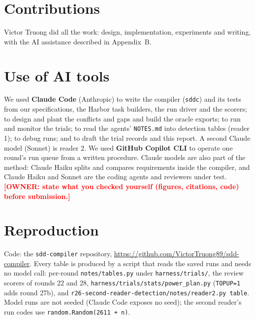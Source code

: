 \documentclass{article}
\newcommand{\owner}[1]{\textcolor{red}{\textbf{[OWNER: #1]}}}
\newcommand{\code}[1]{\texttt{#1}}
\begin{document}



\appendix

\section{Contributions}
Victor Truong did all the work: design, implementation, experiments and writing, with the AI assistance
described in Appendix~B.

\section{Use of AI tools}
We used \textbf{Claude Code} (Anthropic) to write the compiler (\code{sddc}) and its tests from our
specifications, the Harbor task builders, the run driver and the scorers; to design and plant the
conflicts and gaps and build the oracle exports; to run and monitor the trials; to read the agents'
\code{NOTES.md} into detection tables (reader 1); to debug runs; and to draft the trial records and this
report. A second Claude model (Sonnet) is reader 2. We used \textbf{GitHub Copilot CLI} to operate one round's
run queue from a written procedure. Claude models are also part of the method: Claude Haiku splits and
compares requirements inside the compiler, and Claude Haiku and Sonnet are the coding agents and reviewers
under test. \owner{state what you checked yourself (figures, citations, code) before submission.}

\section{Reproduction}
Code: the \code{sdd-compiler} repository, \url{https://github.com/VictorTruong89/sdd-compiler}. Every table is produced by a script that reads the
saved runs and needs no model call: per-round \code{notes/tables.py} under \code{harness/trials/}, the review
scorers of rounds 22 and 28, \code{harness/trials/stats/power\_plan.py} (\code{TOPUP=1} adds round 27b), and
\code{r26-second-reader-detection/notes/reader2.py table}. Model runs are not seeded (Claude Code exposes no
seed); the second reader's run codes use \code{random.Random(2611 + n)}.
\end{document}
